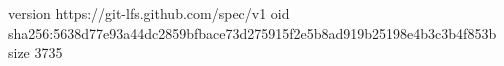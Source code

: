 version https://git-lfs.github.com/spec/v1
oid sha256:5638d77e93a44dc2859bfbace73d275915f2e5b8ad919b25198e4b3c3b4f853b
size 3735
